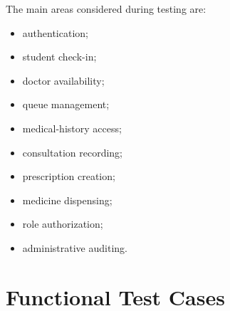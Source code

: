 \documentclass{tietreport}
\begin{document}
The main areas considered during testing are:

\begin{itemize}
    \item authentication;
    \item student check-in;
    \item doctor availability;
    \item queue management;
    \item medical-history access;
    \item consultation recording;
    \item prescription creation;
    \item medicine dispensing;
    \item role authorization;
    \item administrative auditing.
\end{itemize}

\section{Functional Test Cases}
\end{document}
